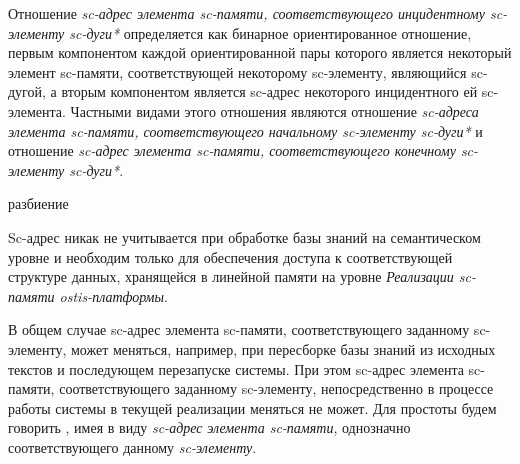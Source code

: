 Отношение \textit{sc-адрес элемента sc-памяти, соответствующего инцидентному sc-элементу sc-дуги*} определяется как бинарное ориентированное отношение, первым компонентом каждой ориентированной пары которого является некоторый элемент sc-памяти, соответствующей некоторому sc-элементу, являющийся sc-дугой, а вторым компонентом является sc-адрес некоторого инцидентного ей sc-элемента. Частными видами этого отношения являются отношение \textit{sc-адреса элемента sc-памяти, соответствующего начальному sc-элементу sc-дуги*} и отношение \textit{sc-адрес элемента sc-памяти, соответствующего конечному sc-элементу sc-дуги*}.

\begin{SCn}
\begin{scnrelfromset}{разбиение}
\end{scnrelfromset}
\end{SCn}

Sc-адрес никак не учитывается при обработке базы знаний на семантическом уровне и необходим только для обеспечения доступа к соответствующей структуре данных, хранящейся в линейной памяти на уровне \textit{Реализации sc-памяти ostis-платформы}.

В общем случае sc-адрес элемента sc-памяти, соответствующего заданному sc-элементу, может меняться, например, при пересборке базы знаний из исходных текстов и последующем перезапуске системы. При этом sc-адрес элемента sc-памяти, соответствующего заданному sc-элементу, непосредственно в процессе работы системы в текущей реализации меняться не может. Для простоты будем говорить , имея в виду \textit{sc-адрес} \textit{элемента sc-памяти}, однозначно соответствующего данному \textit{sc-элементу}.

